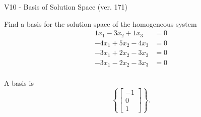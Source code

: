 \begin{exercise}
  \begin{exerciseTitle}V10 - Basis of Solution Space (ver. 171)\end{exerciseTitle}
  \begin{exerciseStatement}
    Find a basis for the solution space of the homogeneous system 
\begin{align*}
 1 x_ 1 -3 x_ 2 + 1 x_ 3 &= 0  \\ 
  -4 x_ 1 + 5 x_ 2 -4 x_ 3 &= 0  \\ 
  -3 x_ 1 + 2 x_ 2 -3 x_ 3 &= 0  \\ 
  -3 x_ 1 -2 x_ 2 -3 x_ 3 &= 0  \\ 
 \end{align*}


 
  \end{exerciseStatement}

  \begin{exerciseAnswer}
   A basis is   
\[\left\{\left[\begin{array}{c}
-1 \\
0 \\
1
\end{array}\right]\right\}.\]

  


  \end{exerciseAnswer}
\end{exercise}